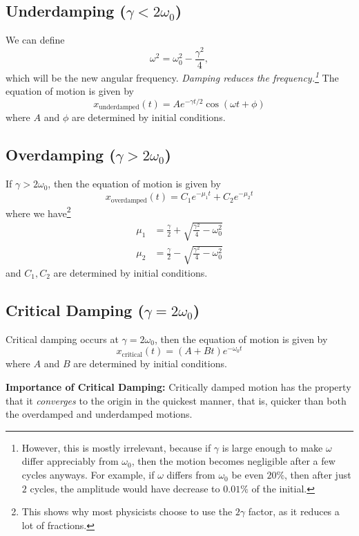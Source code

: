 \documentclass{article}
\begin{document}
\subsection{Underdamping ($\gamma < 2\omega_0$)}
We can define
\begin{equation}
    \omega^2 = \omega_0^2 - \frac{\gamma^2}{4},
\end{equation}
which will be the new angular frequency. \textit{Damping reduces the frequency.\footnote{However, this is mostly irrelevant, because if $\gamma$ is large enough to make $\omega$ differ appreciably from $\omega_0$, then the motion becomes negligible after a few cycles anyways. For example, if $\omega$ differs from $\omega_0$ be even $20\%$, then after just $2$ cycles, the amplitude would have decrease to $0.01\%$ of the initial.}} The equation of motion is given by
\begin{equation}
    x_\text{underdamped}(t) = Ae^{-\gamma t/2}\cos(\omega t + \phi)
\end{equation}
where $A$ and $\phi$ are determined by initial conditions.
\subsection{Overdamping ($\gamma > 2\omega_0$)}
If $\gamma > 2\omega_0$, then the equation of motion is given by
\begin{equation}
    x_\text{overdamped}(t) = C_1e^{-\mu_1 t} + C_2 e^{-\mu_2 t}
\end{equation}
where we have\footnote{This shows why most physicists choose to use the $2\gamma$ factor, as it reduces a lot of fractions.} 
\begin{align}
    \mu_1 &= \frac{\gamma}{2} + \sqrt{\frac{\gamma^2}{4} - \omega_0^2} \\ 
    \mu_2 &= \frac{\gamma}{2} - \sqrt{\frac{\gamma^2}{4} - \omega_0^2}
\end{align}
and $C_1,C_2$ are determined by initial conditions.
\subsection{Critical Damping ($\gamma=2\omega_0$)}
Critical damping occurs at $\gamma=2\omega_0$, then the equation of motion is given by 
\begin{equation}
    x_\text{critical}(t) = (A+Bt)e^{-\omega_0t}
\end{equation}
where $A$ and $B$ are determined by initial conditions.

\textbf{Importance of Critical Damping:} Critically damped motion has the property that it \textit{converges} to the origin in the quickest manner, that is, quicker than both the overdamped and underdamped motions.
\end{document}
